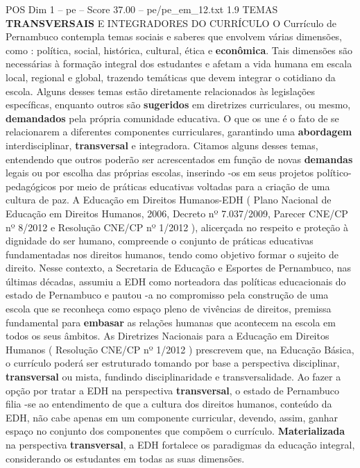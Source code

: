 \begin{textsample}{POS Dim 1 – pe – Score 37.00 – pe/pe\_em\_12.txt}  \label{ex:f1_pos_247}
1.9 TEMAS \textbf{TRANSVERSAIS} E INTEGRADORES DO CURRÍCULO O Currículo de Pernambuco contempla temas sociais e saberes que envolvem várias dimensões, como : política, social, histórica, cultural, ética e \textbf{econômica}.
Tais dimensões são necessárias à formação integral dos estudantes e afetam a vida humana em escala local, regional e global, trazendo temáticas que devem integrar o cotidiano da escola.
Alguns desses temas estão diretamente relacionados às legislações específicas, enquanto outros são \textbf{sugeridos} em diretrizes curriculares, ou mesmo, \textbf{demandados} pela própria comunidade educativa.
O que os une é o fato de se relacionarem a diferentes componentes curriculares, garantindo uma \textbf{abordagem} interdisciplinar, \textbf{transversal} e integradora.
Citamos alguns desses temas, entendendo que outros poderão ser acrescentados em função de novas \textbf{demandas} legais ou por escolha das próprias escolas, inserindo -os em seus projetos político-pedagógicos por meio de práticas educativas voltadas para a criação de uma cultura de paz.
A Educação em Direitos Humanos-EDH ( Plano Nacional de Educação em Direitos Humanos, 2006, Decreto nº 7.037/2009, Parecer CNE/CP nº 8/2012 e Resolução CNE/CP nº 1/2012 ), alicerçada no respeito e proteção à dignidade do ser humano, compreende o conjunto de práticas educativas fundamentadas nos direitos humanos, tendo como objetivo formar o sujeito de direito.
Nesse contexto, a Secretaria de Educação e Esportes de Pernambuco, nas últimas décadas, assumiu a EDH como norteadora das políticas educacionais do estado de Pernambuco e pautou -a no compromisso pela construção de uma escola que se reconheça como espaço pleno de vivências de direitos, premissa fundamental para \textbf{embasar} as relações humanas que acontecem na escola em todos os seus âmbitos.
As Diretrizes Nacionais para a Educação em Direitos Humanos ( Resolução CNE/CP nº 1/2012 ) prescrevem que, na Educação Básica, o currículo poderá ser estruturado tomando por base a perspectiva disciplinar, \textbf{transversal} ou mista, fundindo disciplinaridade e transversalidade.
Ao fazer a opção por tratar a EDH na perspectiva \textbf{transversal}, o estado de Pernambuco filia -se ao entendimento de que a cultura dos direitos humanos, conteúdo da EDH, não cabe apenas em um componente curricular, devendo, assim, ganhar espaço no conjunto dos componentes que compõem o currículo. \textbf{Materializada} na perspectiva \textbf{transversal}, a EDH fortalece os paradigmas da educação integral, considerando os estudantes em todas as suas dimensões.

\end{textsample}

